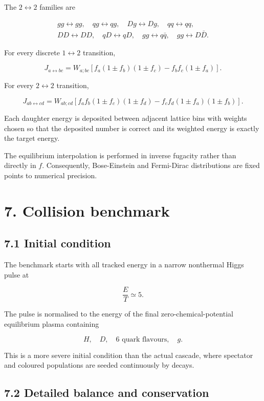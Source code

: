 \documentclass[
  10pt,
]{article}
\begin{document}
The \(2\leftrightarrow2\) families are

\[
\begin{gathered}
gg\leftrightarrow gg,
\quad
qg\leftrightarrow qg,
\quad
Dg\leftrightarrow Dg,
\quad
qq\leftrightarrow qq,
\\
DD\leftrightarrow DD,
\quad
qD\leftrightarrow qD,
\quad
gg\leftrightarrow q\bar q,
\quad
gg\leftrightarrow D\bar D.
\end{gathered}
\]

For every discrete \(1\leftrightarrow2\) transition,

\[
J_{a\leftrightarrow bc}
=
W_{a;bc}
\left[
 f_a(1\pm f_b)(1\pm f_c)
-
f_bf_c(1\pm f_a)
\right].
\]

For every \(2\leftrightarrow2\) transition,

\[
J_{ab\leftrightarrow cd}
=
W_{ab;cd}
\left[
 f_af_b(1\pm f_c)(1\pm f_d)
-
f_cf_d(1\pm f_a)(1\pm f_b)
\right].
\]

Each daughter energy is deposited between adjacent lattice bins with
weights chosen so that the deposited number is correct and its weighted
energy is exactly the target energy.

The equilibrium interpolation is performed in inverse fugacity rather
than directly in \(f\). Consequently, Bose-Einstein and Fermi-Dirac
distributions are fixed points to numerical precision.

\section{7. Collision benchmark}\label{collision-benchmark}

\subsection{7.1 Initial condition}\label{initial-condition}

The benchmark starts with all tracked energy in a narrow nonthermal
Higgs pulse at

\[
\frac ET\simeq5.
\]

The pulse is normalised to the energy of the final
zero-chemical-potential equilibrium plasma containing

\[
H,
\quad
D,
\quad
6\text{ quark flavours},
\quad
g.
\]

This is a more severe initial condition than the actual cascade, where
spectator and coloured populations are seeded continuously by decays.

\subsection{7.2 Detailed balance and
conservation}\label{detailed-balance-and-conservation}
\end{document}

